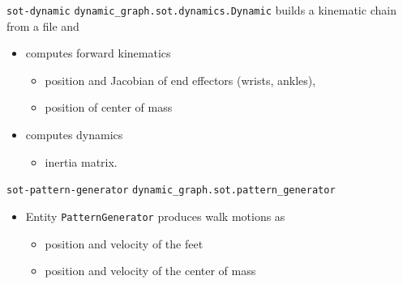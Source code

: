 %
%


%
%

\begin{frame} {\texttt{sot-dynamic}}
  \texttt{dynamic\_graph.sot.dynamics.Dynamic} builds a kinematic chain from a file and
  \begin{itemize}
  \item computes forward kinematics
    \begin{itemize}
      \item position and Jacobian of end effectors (wrists, ankles),
      \item position of center of mass
    \end{itemize}
    \item computes dynamics
    \begin{itemize}
      \item inertia matrix.
    \end{itemize}
  \end{itemize}
\end{frame}

%
%

\begin{frame} {\texttt{sot-pattern-generator}}
  \texttt{dynamic\_graph.sot.pattern\_generator} 
  \begin{itemize}
  \item Entity \texttt{PatternGenerator} produces walk motions as
    \begin{itemize}
      \item position and velocity of the feet
      \item position and velocity of the center of mass
    \end{itemize}
  \end{itemize}
\end{frame}

